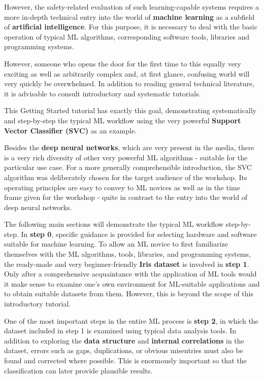 \documentclass [oneside,10pt,a4paper,ngerman,BCOR10mm,headsepline,parindent,final]{scrartcl}
\begin{document}
However, the safety-related evaluation of such learning-capable systems
requires a more in-depth technical entry into the world of
\textbf{machine learning} as a subfield of \textbf{artificial
intelligence}. For this purpose, it is necessary to deal with the basic
operation of typical ML algorithms, corresponding software tools,
libraries and programming systems.

However, someone who opens the door for the first time to this equally
very exciting as well as arbitrarily complex and, at first glance,
confusing world will very quickly be overwhelmed. In addition to reading
general technical literature, it is advisable to consult introductory
and systematic tutorials.

This Getting Started tutorial has exactly this goal, demonstrating
systematically and step-by-step the typical ML workflow using the very
powerful \textbf{Support Vector Classifier (SVC)} as an example.

Besides the \textbf{deep neural networks}, which are very present in the
media, there is a very rich diversity of other very powerful ML
algorithms - suitable for the particular use case. For a more generally
comprehensible introduction, the SVC algorithm was deliberately chosen
for the target audience of the workshop. Its operating principles are
easy to convey to ML novices as well as in the time frame given for the
workshop - quite in contrast to the entry into the world of deep neural
networks.

The following main sections will demonstrate the typical ML workflow
step-by-step. In \textbf{step 0}, specific guidance is provided for
selecting hardware and software suitable for machine learning. To allow
an ML novice to first familiarize themselves with the ML algorithms,
tools, libraries, and programming systems, the ready-made and very
beginner-friendly \textbf{Iris dataset} is involved in \textbf{step 1}.
Only after a comprehensive acquaintance with the application of ML tools
would it make sense to examine one's own environment for ML-suitable
applications and to obtain suitable datasets from them. However, this is
beyond the scope of this introductory tutorial.

One of the most important steps in the entire ML process is \textbf{step
2}, in which the dataset included in step 1 is examined using typical
data analysis tools. In addition to exploring the \textbf{data
structure} and \textbf{internal correlations} in the dataset, errors
such as gaps, duplications, or obvious misentries must also be found and
corrected where possible. This is enormously important so that the
classification can later provide plausible results.
\end{document}

